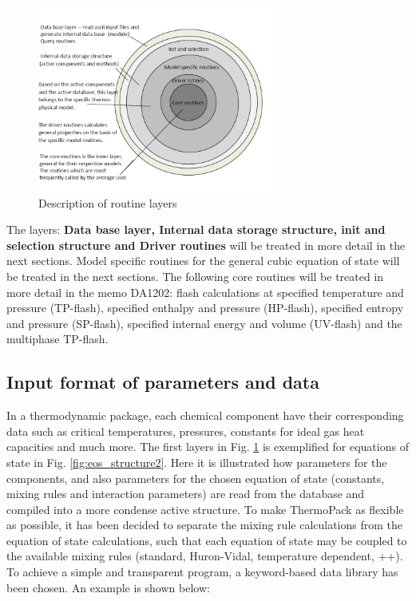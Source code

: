 \documentclass[a4paper, 12pt, english, sintefheadings, sintefcolour]{sintefmemo}
\begin{document}
\begin{figure}[ht]
\centering
\includegraphics[width=0.70\textwidth]{eos_structure1.png}
\caption{Description of routine layers}
\label{fig:eos_structure1}
\end{figure}   

The layers: \textbf{Data base layer, Internal data storage structure, init and
  selection structure and Driver routines} will be treated in more detail in
the next sections. Model specific routines for the general cubic equation of
state will be treated in the next sections. The following core routines will
be treated in more detail in the memo DA1202: flash calculations at specified
temperature and pressure (TP-flash), specified enthalpy and pressure
(HP-flash), specified entropy and pressure (SP-flash), specified internal
energy and volume (UV-flash) and the multiphase TP-flash.

\subsection{Input format of parameters and data}
In a thermodynamic package, each chemical component have their corresponding
data such as critical temperatures, pressures, constants for ideal gas heat
capacities and much more. The first layers in Fig. \ref{fig:eos_structure1} is
exemplified for equations of state in Fig. \ref{fig:eos_structure2}. Here it
is illustrated how parameters for the components, and also parameters for the
chosen equation of state (constants, mixing rules and interaction parameters)
are read from the database and compiled into a more condense active
structure. To make ThermoPack as flexible as possible, it has been decided to
separate the mixing rule calculations from the equation of state calculations,
such that each equation of state may be coupled to the available mixing rules
(standard, Huron-Vidal, temperature dependent, ++). To achieve a simple and
transparent program, a keyword-based data library has been chosen. An example
is shown below:
\end{document}
